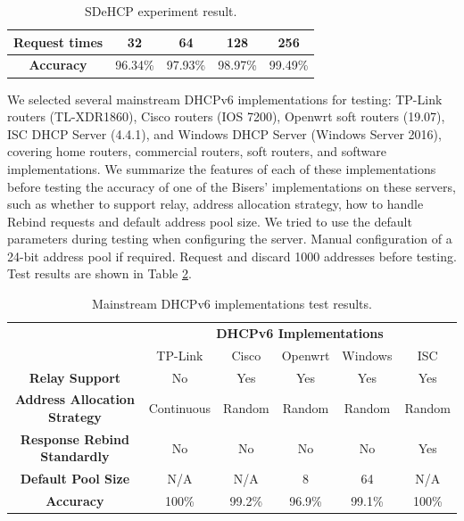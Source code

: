 \documentclass[conference]{IEEEtran}
\begin{document}
\begin{table}[htbp]
  \caption{SDeHCP experiment result.}
  \begin{center}
    \begin{tabular}{|c|c|c|c|c|}
      \hline
      \textbf{Request times} & 32 & 64 & 128 & 256 \\
      \hline
      \textbf{Accuracy} & 96.34\% & 97.93\% & 98.97\% & 99.49\% \\
      \hline
    \end{tabular}
    \label{tabSDeHCP}
  \end{center}
\end{table}

We selected several mainstream DHCPv6 implementations for testing:
TP-Link routers (TL-XDR1860), Cisco routers (IOS 7200), Openwrt soft
routers (19.07), ISC DHCP Server (4.4.1), and Windows DHCP Server
(Windows Server 2016), covering home routers, commercial routers, soft
routers, and software implementations. We summarize the features of
each of these implementations before testing the accuracy of one of
the Bisers' implementations on these servers, such as whether to
support relay, address allocation strategy, how to handle Rebind
requests and default address pool size. We tried to use the default
parameters during testing when configuring the server. Manual
configuration of a 24-bit address pool if required. Request and
discard 1000 addresses before testing. Test results are shown in Table
\ref{tabDHCPv6Server}.

\begin{table}[htbp]
  \caption{Mainstream DHCPv6 implementations test results.}
  \begin{center}
    \begin{tabular}{|c|c|c|c|c|c|}
      \hline
      & \multicolumn{5}{|c|}{\textbf{DHCPv6 Implementations}} \\
      \cline{2-6}
      & TP-Link & Cisco & Openwrt & Windows & ISC \\
      \hline
      \textbf{Relay Support} & No & Yes & Yes & Yes & Yes \\
      \textbf{Address Allocation Strategy} & Continuous & Random & Random & Random & Random \\
      \textbf{Response Rebind Standardly} & No & No & No & No & Yes \\
      \textbf{Default Pool Size} & N/A & N/A & 8 & 64 & N/A \\
      \textbf{Accuracy} & 100\% & 99.2\% & 96.9\% & 99.1\% & 100\% \\
      \hline
    \end{tabular}
    \label{tabDHCPv6Server}
  \end{center}
\end{table}
\end{document}
